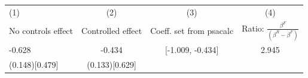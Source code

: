 {
\def\sym#1{\ifmmode^{#1}\else\(^{#1}\)\fi}
\begin{tabular}{l*{3}{c}}
\hline\hline
(1) & (2) & (3) & (4) \\
No controls effect &     Controlled effect&  Coeff. set from psacalc &     Ratio: $\frac{\beta^F}{(\beta^R-\beta^F)}$\\
\hline
            -0.628      &   -0.434  &  [-1.009, -0.434] & 2.945 \\
              (0.148)[0.479]     & (0.133)[0.629] & &  \\
\hline\hline
\end{tabular}
}
